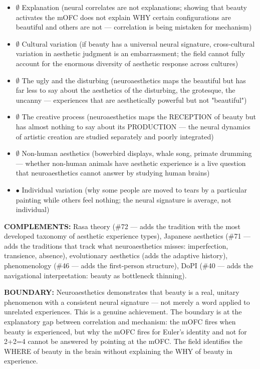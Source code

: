 \begin{itemize}[nosep,leftmargin=*]
  \item $\emptyset$ Explanation (neural correlates are not explanations; showing that beauty activates the mOFC does not explain WHY certain configurations are beautiful and others are not — correlation is being mistaken for mechanism)
  \item $\emptyset$ Cultural variation (if beauty has a universal neural signature, cross-cultural variation in aesthetic judgment is an embarrassment; the field cannot fully account for the enormous diversity of aesthetic response across cultures)
  \item $\emptyset$ The ugly and the disturbing (neuroaesthetics maps the beautiful but has far less to say about the aesthetics of the disturbing, the grotesque, the uncanny — experiences that are aesthetically powerful but not "beautiful")
  \item $\emptyset$ The creative process (neuroaesthetics maps the RECEPTION of beauty but has almost nothing to say about its PRODUCTION — the neural dynamics of artistic creation are studied separately and poorly integrated)
  \item $\emptyset$ Non-human aesthetics (bowerbird displays, whale song, primate drumming — whether non-human animals have aesthetic experience is a live question that neuroaesthetics cannot answer by studying human brains)
  \item $\bullet$ Individual variation (why some people are moved to tears by a particular painting while others feel nothing; the neural signature is average, not individual)
\end{itemize}


\textbf{COMPLEMENTS:} Rasa theory (\#72 — adds the tradition with the most developed taxonomy of aesthetic experience types), Japanese aesthetics (\#71 — adds the traditions that track what neuroaesthetics misses: imperfection, transience, absence), evolutionary aesthetics (adds the adaptive history), phenomenology (\#46 — adds the first-person structure), DoPI (\#40 — adds the navigational interpretation: beauty as bottleneck thinning).


\textbf{BOUNDARY:} Neuroaesthetics demonstrates that beauty is a real, unitary phenomenon with a consistent neural signature — not merely a word applied to unrelated experiences. This is a genuine achievement. The boundary is at the explanatory gap between correlation and mechanism: the mOFC fires when beauty is experienced, but why the mOFC fires for Euler's identity and not for 2+2=4 cannot be answered by pointing at the mOFC. The field identifies the WHERE of beauty in the brain without explaining the WHY of beauty in experience.


